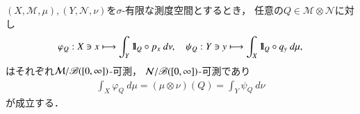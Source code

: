 	\begin{screen}
		\begin{lem}\label{lem:Fubini_theorem}
			$(X,\mathcal{M},\mu),(Y,\mathcal{N},\nu)$を$\sigma$-有限な測度空間とするとき，
			任意の$Q \in \mathcal{M} \otimes \mathcal{N}$に対し
			\begin{align}
				\varphi_Q: X \ni x \longmapsto \int_Y \mbox{1}\hspace{-0.25em}\mbox{l}_{Q}\circ p_x\ d\nu,
				\quad \psi_Q: Y \ni y \longmapsto \int_X \mbox{1}\hspace{-0.25em}\mbox{l}_{Q} \circ q_y\ d\mu,
			\end{align}
			はそれぞれ$\mathcal{M}/\mathscr{B}([0,\infty])$-可測，
			$\mathcal{N}/\mathscr{B}([0,\infty])$-可測であり
			\begin{align}
				\int_X \varphi_Q\ d\mu
				= (\mu \otimes \nu)(Q)
				= \int_Y \psi_Q\ d\nu
				\label{eq:lem_Fubini_theorem_1}
			\end{align}
			が成立する．
		\end{lem}
	\end{screen}
	
